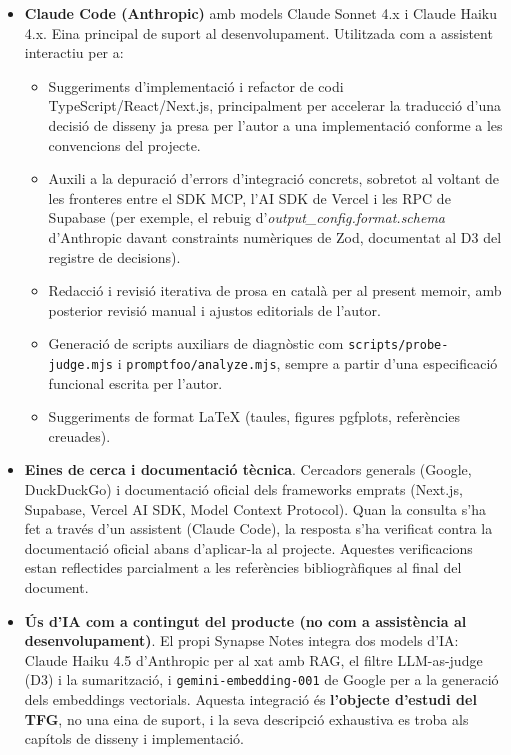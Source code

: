 \begin{itemize}
    \item \textbf{Claude Code (Anthropic)} amb models Claude Sonnet 4.x i Claude Haiku 4.x. Eina principal de suport al desenvolupament. Utilitzada com a assistent interactiu per a:
    \begin{itemize}
        \item Suggeriments d'implementació i refactor de codi TypeScript/React/Next.js, principalment per accelerar la traducció d'una decisió de disseny ja presa per l'autor a una implementació conforme a les convencions del projecte.
        \item Auxili a la depuració d'errors d'integració concrets, sobretot al voltant de les fronteres entre el SDK MCP, l'AI SDK de Vercel i les RPC de Supabase (per exemple, el rebuig d'\textit{output\_config.format.schema} d'Anthropic davant constraints numèriques de Zod, documentat al D3 del registre de decisions).
        \item Redacció i revisió iterativa de prosa en català per al present memoir, amb posterior revisió manual i ajustos editorials de l'autor.
        \item Generació de scripts auxiliars de diagnòstic com \texttt{scripts/probe-judge.mjs} i \texttt{promptfoo/analyze.mjs}, sempre a partir d'una especificació funcional escrita per l'autor.
        \item Suggeriments de format LaTeX (taules, figures pgfplots, referències creuades).
    \end{itemize}

    \item \textbf{Eines de cerca i documentació tècnica}. Cercadors generals (Google, DuckDuckGo) i documentació oficial dels frameworks emprats (Next.js, Supabase, Vercel AI SDK, Model Context Protocol). Quan la consulta s'ha fet a través d'un assistent (Claude Code), la resposta s'ha verificat contra la documentació oficial abans d'aplicar-la al projecte. Aquestes verificacions estan reflectides parcialment a les referències bibliogràfiques al final del document.

    \item \textbf{Ús d'IA com a contingut del producte (no com a assistència al desenvolupament)}. El propi Synapse Notes integra dos models d'IA: Claude Haiku 4.5 d'Anthropic per al xat amb RAG, el filtre LLM-as-judge (D3) i la sumarització, i \texttt{gemini-embedding-001} de Google per a la generació dels embeddings vectorials. Aquesta integració és \textbf{l'objecte d'estudi del TFG}, no una eina de suport, i la seva descripció exhaustiva es troba als capítols de disseny i implementació.
\end{itemize}

